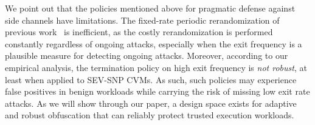 



We point out that the policies mentioned above for pragmatic defense against side channels have limitations.
The fixed-rate periodic rerandomization of previous work~\cite{zhang2020klotski} is inefficient, as the costly rerandomization is performed constantly regardless of ongoing attacks, especially when the exit frequency is a plausible measure for detecting ongoing attacks.
Moreover, according to our empirical analysis, the termination policy on high exit frequency is \emph{not robust}, at least when applied to SEV-SNP CVMs.
As such, such policies may experience false positives in benign workloads while carrying the risk of missing low exit rate attacks.
As we will show through our paper, a design space exists for adaptive and robust obfuscation that can reliably protect trusted execution workloads.









